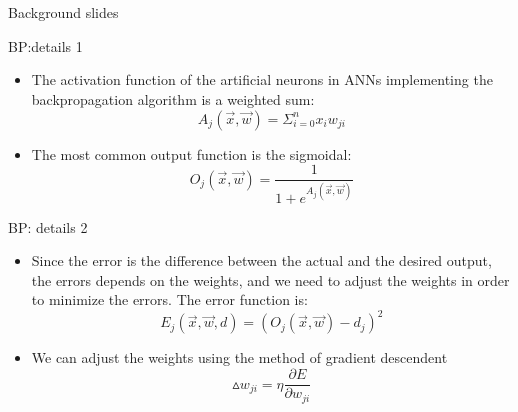 \section{}
\begin{frame}{}
\begin{center}
Background slides
\end{center}
\end{frame}
\begin{frame}{BP:details 1}
\begin{itemize}
\item The activation function of the artificial neurons in ANNs implementing the backpropagation algorithm is a weighted sum:
\begin{equation}
A_{j}(\vec x,\vec w)=\Sigma_{i=0}^{n}x_{i}w_{ji} 
\end{equation}
\item The most common output function is the sigmoidal:
\begin{equation}
O_{j}(\vec x,\vec w)=\frac{1}{1+e^{A_{j}(\vec x,\vec w)}}
\end{equation}
\end{itemize}
\end{frame}
\begin{frame}{BP: details 2}
\begin{itemize}
\item  Since the error is the difference between the actual and the desired output, the errors depends on the weights, and we need to adjust the weights in order to minimize the errors. The error function is:
\begin{equation}
E_{j}(\vec x,\vec w,d)=(O_{j}(\vec x,\vec w)-d_{j})^2
\end{equation}
\item We can adjust the weights using the method of gradient descendent
\begin{equation}
\vartriangle w_{ji}=\eta\frac{\partial E}{\partial w_{ji}}
\end{equation}
\end{itemize}
\end{frame}
